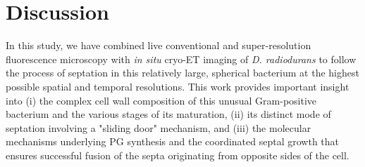 \FloatBarrier

\section{Discussion}\label{ftsz_discussion}

In this study, we have combined live conventional and super-resolution fluorescence microscopy with \textit{in situ} cryo-ET imaging of \textit{D. radiodurans} to follow the process of septation in this relatively large, spherical bacterium at the highest possible spatial and temporal resolutions.
This work provides important insight into (i) the complex cell wall composition of this unusual Gram-positive bacterium and the various stages of its maturation, (ii) its distinct mode of septation involving a "sliding door" mechanism, and (iii) the molecular mechanisms underlying PG synthesis and the coordinated septal growth that ensures successful fusion of the septa originating from opposite sides of the cell.

